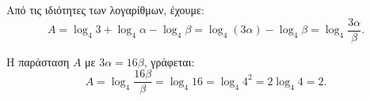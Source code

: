 \begin{alist}
\item Από τις ιδιότητες των λογαρίθμων, έχουμε:
\[A = \log_4 3 + \log_4 \alpha - \log_4 \beta = \log_4(3\alpha) - \log_4 \beta = \log_4\frac{3\alpha}{\beta}.\]
\item Η παράσταση $A$ με $3\alpha = 16\beta$, γράφεται:
\[A = \log_4\frac{16\beta}{\beta} = \log_4 16 = \log_4 4^2 = 2\log_4 4 = 2.\]
\end{alist}

